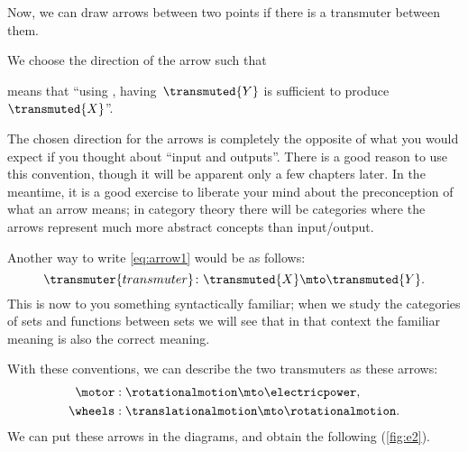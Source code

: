 Now, we can draw arrows between two points if there is a transmuter between them.

We choose the direction of the arrow such that


means that ``using , having~$\transmuted{Y}$ is sufficient to produce~$\transmuted{X}$''.

\begin{remark}
    The chosen direction
    for the arrows is completely the opposite of what you would expect if you thought about
    ``input and outputs''.
    There is a good reason to use this convention, though it will
    be apparent only a few chapters later.
    In the meantime, it is a good exercise
    to liberate your mind about the preconception of what an arrow means; in category theory
    there will be categories where the arrows represent much more abstract concepts than input/output.
\end{remark}

Another way to write \cref{eq:arrow1} would be as follows:
\begin{equation}
    \transmuter{transmuter} \colon \transmuted{X} \mto \transmuted{Y}.
\end{equation}
This is now to you something syntactically familiar; when we study the categories of sets and functions between sets we will see that in that context the familiar meaning is also the correct meaning.

With these conventions, we can describe the two transmuters as these arrows:
%
\begin{equation}
    \label{eq:transmutation_example}
    \begin{aligned}
        \motor&:  \rotationalmotion \mto \electricpower, \\
        \wheels&: \translationalmotion \mto \rotationalmotion.
    \end{aligned}
\end{equation}
%
We can put these arrows in the diagrams, and obtain
the following (\cref{fig:e2}).





